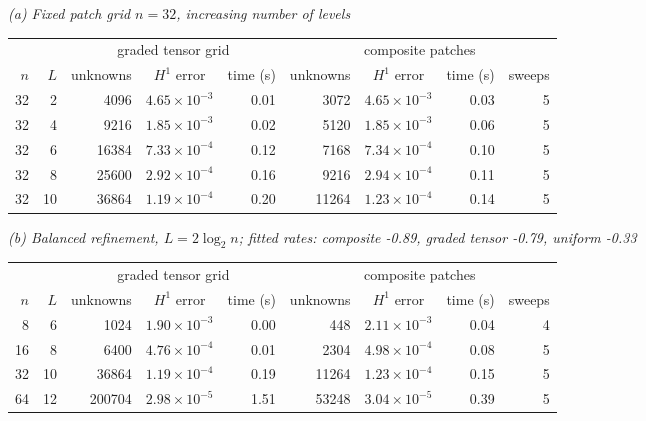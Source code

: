 \textit{(a) Fixed patch grid $n=32$, increasing number of levels}\\[2pt]
\begin{tabular}{rr rcr rcrr}
\toprule
 & & \multicolumn{3}{c}{graded tensor grid} & \multicolumn{4}{c}{composite patches}\\
\cmidrule(lr){3-5}\cmidrule(lr){6-9}
$n$ & $L$ & unknowns & $H^1$ error & time (s) & unknowns & $H^1$ error & time (s) & sweeps\\
\midrule
32 & 2 & 4096 & $4.65{\times}10^{-3}$ & 0.01 & 3072 & $4.65{\times}10^{-3}$ & 0.03 & 5\\
32 & 4 & 9216 & $1.85{\times}10^{-3}$ & 0.02 & 5120 & $1.85{\times}10^{-3}$ & 0.06 & 5\\
32 & 6 & 16384 & $7.33{\times}10^{-4}$ & 0.12 & 7168 & $7.34{\times}10^{-4}$ & 0.10 & 5\\
32 & 8 & 25600 & $2.92{\times}10^{-4}$ & 0.16 & 9216 & $2.94{\times}10^{-4}$ & 0.11 & 5\\
32 & 10 & 36864 & $1.19{\times}10^{-4}$ & 0.20 & 11264 & $1.23{\times}10^{-4}$ & 0.14 & 5\\
\bottomrule
\end{tabular}

\medskip
\textit{(b) Balanced refinement, $L=2\log_2n$; fitted rates: composite -0.89, graded tensor -0.79, uniform -0.33}\\[2pt]
\begin{tabular}{rr rcr rcrr}
\toprule
 & & \multicolumn{3}{c}{graded tensor grid} & \multicolumn{4}{c}{composite patches}\\
\cmidrule(lr){3-5}\cmidrule(lr){6-9}
$n$ & $L$ & unknowns & $H^1$ error & time (s) & unknowns & $H^1$ error & time (s) & sweeps\\
\midrule
8 & 6 & 1024 & $1.90{\times}10^{-3}$ & 0.00 & 448 & $2.11{\times}10^{-3}$ & 0.04 & 4\\
16 & 8 & 6400 & $4.76{\times}10^{-4}$ & 0.01 & 2304 & $4.98{\times}10^{-4}$ & 0.08 & 5\\
32 & 10 & 36864 & $1.19{\times}10^{-4}$ & 0.19 & 11264 & $1.23{\times}10^{-4}$ & 0.15 & 5\\
64 & 12 & 200704 & $2.98{\times}10^{-5}$ & 1.51 & 53248 & $3.04{\times}10^{-5}$ & 0.39 & 5\\
\bottomrule
\end{tabular}

